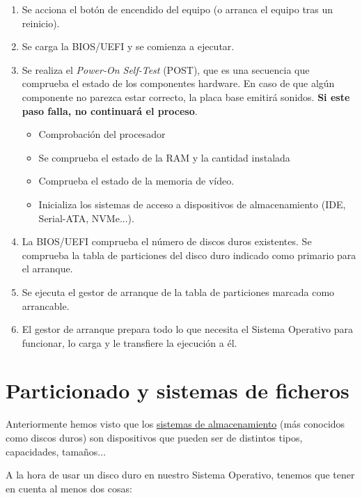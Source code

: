 \begin{enumerate}
    \item Se acciona el botón de encendido del equipo (o arranca el equipo tras un reinicio).
    \item Se carga la BIOS/UEFI y se comienza a ejecutar.
    \item Se realiza el \textit{Power-On Self-Test} (POST), que es una secuencia que comprueba el estado de los componentes hardware. En caso de que algún componente no parezca estar correcto, la placa base emitirá sonidos. \textbf{Si este paso falla, no continuará el proceso}.


    \begin{itemize}
        \item Comprobación del procesador
        \item Se comprueba el estado de la RAM y la cantidad instalada
        \item Comprueba el estado de la memoria de vídeo.
        \item Inicializa los sistemas de acceso a dispositivos de almacenamiento (IDE, Serial-ATA, NVMe...).
    \end{itemize}

    \item La BIOS/UEFI comprueba el número de discos duros existentes. Se comprueba la tabla de particiones del disco duro indicado como primario para el arranque.
    \item Se ejecuta el gestor de arranque de la tabla de particiones marcada como arrancable.
    \item El gestor de arranque prepara todo lo que necesita el Sistema Operativo para funcionar, lo carga y le transfiere la ejecución a él.
\end{enumerate}

\chapter{Particionado y sistemas de ficheros}
Anteriormente hemos visto que los \hyperlink{dispositivos_almacenamiento}{sistemas de almacenamiento} (más conocidos como discos duros) son dispositivos que pueden ser de distintos tipos, capacidades, tamaños...

A la hora de usar un disco duro en nuestro Sistema Operativo, tenemos que tener en cuenta al menos dos cosas:

